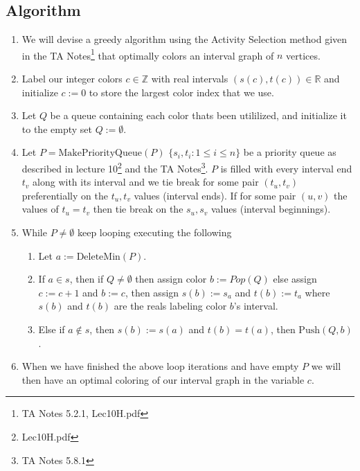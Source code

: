 \documentclass{article}
\newcommand{\RR}{\mathbb{R}} %
\newcommand{\ZZ}{\mathbb{Z}} %
\begin{document}
\subsection{Algorithm}
\begin{enumerate}
      \item We will devise a greedy algorithm using the Activity Selection method given in
            the TA Notes\footnote{TA Notes 5.2.1, Lec10H.pdf} that optimally colors an interval graph of
            \(n\) vertices.
      \item Label our integer colors \( c \in \ZZ \) with real intervals \( (s(c), t(c))
            \in \RR \) and initialize \(c := 0\) to store the largest color index that we
            use.
      \item Let \(Q\) be a queue containing each color thats been utililized, and
            initialize it to the empty set \( Q := \emptyset \).
      \item Let \(P = \text{MakePriorityQueue} (P) \) \( \{ s_i, t_i : 1 \leq i \leq n \}
            \) be a priority queue as described in lecture 10\footnote{Lec10H.pdf} and the
            TA Notes\footnote{TA Notes 5.8.1}. \(P\) is filled with every
            interval end \(t_v\) along with its interval and we tie break for some pair
            \( (t_u,t_v) \) preferentially on the \(t_u, t_v\) values (interval ends). If
            for some pair \( (u,v) \) the values of \( t_u = t_v \) then tie break on the
            \( s_u, s_v\) values (interval beginnings).
      \item While \(P \neq \emptyset \) keep looping executing the following
            \begin{enumerate}
                  \item Let \(a := \text{DeleteMin}(P)\).
                  \item If \(a \in s\), then if \(Q \neq \emptyset \) then assign color
                        \(b := Pop(Q)\) else assign \(c := c + 1\) and \(b := c\), then
                        assign \(s(b) := s_a\) and \(t(b) := t_a\) where \(s(b)\) and
                        \(t(b)\) are the reals labeling color \(b\)'s interval.
                  \item Else if \( a \notin s \), then \( s(b) := s(a)\) and \(t(b) =
                        t(a)\), then \(\text{Push} (Q, b) \).
            \end{enumerate}
      \item When we have finished the above loop iterations and have empty \(P\) we will then have an optimal
            coloring of our interval graph in the variable \(c\).
\end{enumerate}
\end{document}
